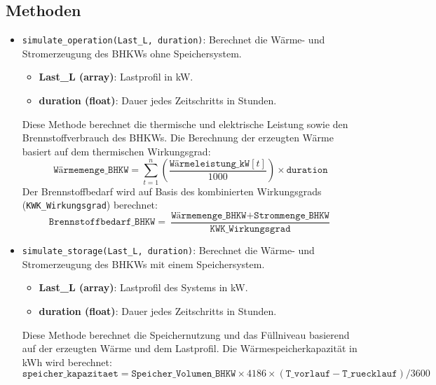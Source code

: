 \subsection{Methoden}
\begin{itemize}
    \item \texttt{simulate\_operation(Last\_L, duration)}: Berechnet die Wärme- und Stromerzeugung des BHKWs ohne Speichersystem.
    \begin{itemize}
        \item \textbf{Last\_L (array)}: Lastprofil in kW.
        \item \textbf{duration (float)}: Dauer jedes Zeitschritts in Stunden.
    \end{itemize}
    Diese Methode berechnet die thermische und elektrische Leistung sowie den Brennstoffverbrauch des BHKWs. Die Berechnung der erzeugten Wärme basiert auf dem thermischen Wirkungsgrad:
    \[
    \texttt{Wärmemenge\_BHKW} = \sum_{t=1}^{n} \left( \frac{\texttt{Wärmeleistung\_kW}[t]}{1000} \right) \times \texttt{duration}
    \]
    Der Brennstoffbedarf wird auf Basis des kombinierten Wirkungsgrads (\texttt{KWK\_Wirkungsgrad}) berechnet:
    \[
    \texttt{Brennstoffbedarf\_BHKW} = \frac{\texttt{Wärmemenge\_BHKW} + \texttt{Strommenge\_BHKW}}{\texttt{KWK\_Wirkungsgrad}}
    \]

    \item \texttt{simulate\_storage(Last\_L, duration)}: Berechnet die Wärme- und Stromerzeugung des BHKWs mit einem Speichersystem.
    \begin{itemize}
        \item \textbf{Last\_L (array)}: Lastprofil des Systems in kW.
        \item \textbf{duration (float)}: Dauer jedes Zeitschritts in Stunden.
    \end{itemize}
    Diese Methode berechnet die Speichernutzung und das Füllniveau basierend auf der erzeugten Wärme und dem Lastprofil. Die Wärmespeicherkapazität in kWh wird berechnet:
    \[
    \texttt{speicher\_kapazitaet} = \texttt{Speicher\_Volumen\_BHKW} \times 4186 \times (\texttt{T\_vorlauf} - \texttt{T\_ruecklauf}) / 3600
    \]
    

\end{itemize}

